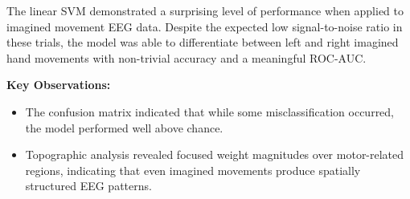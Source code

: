 \documentclass[
  letterpaper,
  DIV=11,
  numbers=noendperiod]{scrartcl}
\providecommand{\tightlist}{%
  \setlength{\itemsep}{0pt}\setlength{\parskip}{0pt}}\usepackage{longtable,booktabs,array}
\begin{document}
The linear SVM demonstrated a surprising level of performance when
applied to imagined movement EEG data. Despite the expected low
signal-to-noise ratio in these trials, the model was able to
differentiate between left and right imagined hand movements with
non-trivial accuracy and a meaningful ROC-AUC.

\textbf{Key Observations:}

\begin{itemize}
\tightlist
\item
  The confusion matrix indicated that while some misclassification
  occurred, the model performed well above chance.
\item
  Topographic analysis revealed focused weight magnitudes over
  motor-related regions, indicating that even imagined movements produce
  spatially structured EEG patterns.
\end{itemize}
\end{document}
